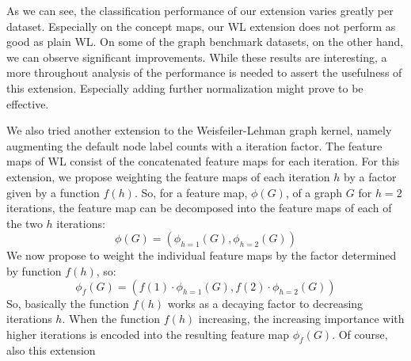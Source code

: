 As we can see, the classification performance of our extension varies greatly per dataset.
Especially on the concept maps, our WL extension does not perform as good as plain WL.
On some of the graph benchmark datasets, on the other hand, we can observe significant improvements.
While these results are interesting, a more throughout analysis of the performance is needed to assert the usefulness of this extension.
Especially adding further normalization might prove to be effective.

\if
We also tried another extension to the Weisfeiler-Lehman graph kernel, namely augmenting the default node label counts with a iteration factor.
The feature maps of WL consist of the concatenated feature maps for each iteration.
For this extension, we propose weighting the feature maps of each iteration $h$ by a factor given by a function $f(h)$.
So, for a feature map, $\phi(G)$, of a graph $G$ for $h=2$ iterations, the feature map can be decomposed into the feature maps of each of the two $h$ iterations:
\begin{equation*}
\phi(G)=(\phi_{h=1}(G), \phi_{h=2}(G))
\end{equation*}
We now propose to weight the individual feature maps by the factor determined by function $f(h)$, so:
\begin{equation*}
\phi_{f}(G)=(f(1) \cdot \phi_{h=1}(G), f(2) \cdot \phi_{h=2}(G))
\end{equation*}
So, basically the function $f(h)$ works as a decaying factor to decreasing iterations $h$.
When the function $f(h)$ increasing, the increasing importance with higher iterations is encoded into the resulting feature map $\phi_f(G)$.
Of course, also this extension 
\fi